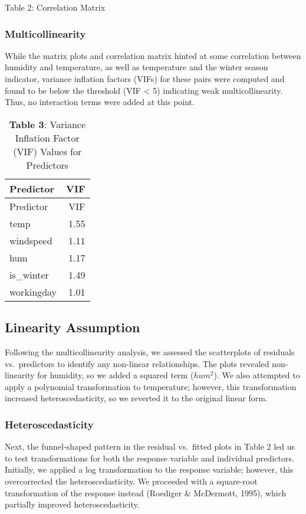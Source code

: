 \documentclass[
  10pt,
]{article}
\begin{document}
Table 2: Correlation Matrix

\subsubsection{Multicollinearity}\label{multicollinearity}

While the matrix plots and correlation matrix hinted at some correlation
between humidity and temperature, as well as temperature and the winter
season indicator, variance inflation factors (VIFs) for these pairs were
computed and found to be below the threshold (VIF \textless{} 5)
indicating weak multicollinearity. Thus, no interaction terms were added
at this point.

\begin{longtable}[]{@{}lr@{}}
\caption{\textbf{Table 3}: Variance Inflation Factor (VIF) Values for
Predictors}\tabularnewline
\toprule\noalign{}
Predictor & VIF \\
\midrule\noalign{}
\endfirsthead
\toprule\noalign{}
Predictor & VIF \\
\midrule\noalign{}
\endhead
\bottomrule\noalign{}
\endlastfoot
temp & 1.55 \\
windspeed & 1.11 \\
hum & 1.17 \\
is\_winter & 1.49 \\
workingday & 1.01 \\
\end{longtable}

\subsection{Linearity Assumption}\label{linearity-assumption}

Following the multicollinearity analysis, we assessed the scatterplots
of residuals vs.~predictors to identify any non-linear relationships.
The plots revealed non-linearity for humidity, so we added a squared
term (\(hum^2\)). We also attempted to apply a polynomial transformation
to temperature; however, this transformation increased
heteroscedasticity, so we reverted it to the original linear form.

\subsubsection{Heteroscedasticity}\label{heteroscedasticity}

Next, the funnel-shaped pattern in the residual vs.~fitted plots in
Table 2 led us to test transformations for both the response variable
and individual predictors. Initially, we applied a log transformation to
the response variable; however, this overcorrected the
heteroscedasticity. We proceeded with a square-root transformation of
the response instead (Roediger \& McDermott, 1995), which partially
improved heteroscedasticity.
\end{document}
